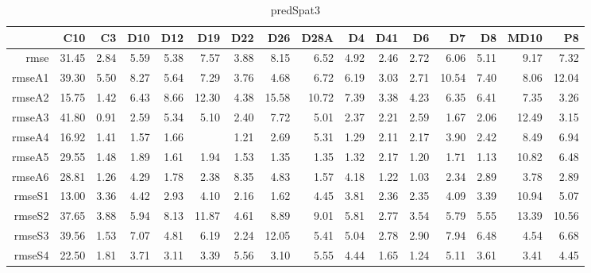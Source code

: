 \begin{table}[H]
\centering
\begin{tabular}{rrrrrrrrrrrrrrrr}
  \hline
 & C10 & C3 & D10 & D12 & D19 & D22 & D26 & D28A & D4 & D41 & D6 & D7 & D8 & MD10 & P8 \\ 
  \hline
rmse & 31.45 & 2.84 & 5.59 & 5.38 & 7.57 & 3.88 & 8.15 & 6.52 & 4.92 & 2.46 & 2.72 & 6.06 & 5.11 & 9.17 & 7.32 \\ 
  rmseA1 & 39.30 & 5.50 & 8.27 & 5.64 & 7.29 & 3.76 & 4.68 & 6.72 & 6.19 & 3.03 & 2.71 & 10.54 & 7.40 & 8.06 & 12.04 \\ 
  rmseA2 & 15.75 & 1.42 & 6.43 & 8.66 & 12.30 & 4.38 & 15.58 & 10.72 & 7.39 & 3.38 & 4.23 & 6.35 & 6.41 & 7.35 & 3.26 \\ 
  rmseA3 & 41.80 & 0.91 & 2.59 & 5.34 & 5.10 & 2.40 & 7.72 & 5.01 & 2.37 & 2.21 & 2.59 & 1.67 & 2.06 & 12.49 & 3.15 \\ 
  rmseA4 & 16.92 & 1.41 & 1.57 & 1.66 &  & 1.21 & 2.69 & 5.31 & 1.29 & 2.11 & 2.17 & 3.90 & 2.42 & 8.49 & 6.94 \\ 
  rmseA5 & 29.55 & 1.48 & 1.89 & 1.61 & 1.94 & 1.53 & 1.35 & 1.35 & 1.32 & 2.17 & 1.20 & 1.71 & 1.13 & 10.82 & 6.48 \\ 
  rmseA6 & 28.81 & 1.26 & 4.29 & 1.78 & 2.38 & 8.35 & 4.83 & 1.57 & 4.18 & 1.22 & 1.03 & 2.34 & 2.89 & 3.78 & 2.89 \\ 
  rmseS1 & 13.00 & 3.36 & 4.42 & 2.93 & 4.10 & 2.16 & 1.62 & 4.45 & 3.81 & 2.36 & 2.35 & 4.09 & 3.39 & 10.94 & 5.07 \\ 
  rmseS2 & 37.65 & 3.88 & 5.94 & 8.13 & 11.87 & 4.61 & 8.89 & 9.01 & 5.81 & 2.77 & 3.54 & 5.79 & 5.55 & 13.39 & 10.56 \\ 
  rmseS3 & 39.56 & 1.53 & 7.07 & 4.81 & 6.19 & 2.24 & 12.05 & 5.41 & 5.04 & 2.78 & 2.90 & 7.94 & 6.48 & 4.54 & 6.68 \\ 
  rmseS4 & 22.50 & 1.81 & 3.71 & 3.11 & 3.39 & 5.56 & 3.10 & 5.55 & 4.44 & 1.65 & 1.24 & 5.11 & 3.61 & 3.41 & 4.45 \\ 
   \hline
\end{tabular}
\caption{predSpat3} 
\end{table}
